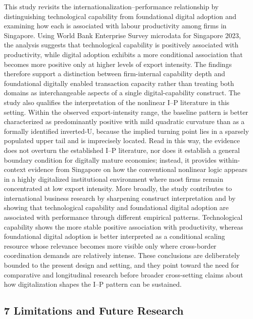 \documentclass[
  12pt,a4paper]{article}
\begin{document}
This study revisits the internationalization--performance relationship
by distinguishing technological capability from foundational digital
adoption and examining how each is associated with labour productivity
among firms in Singapore. Using World Bank Enterprise Survey microdata
for Singapore 2023, the analysis suggests that technological capability
is positively associated with productivity, while digital adoption
exhibits a more conditional association that becomes more positive only
at higher levels of export intensity. The findings therefore support a
distinction between firm-internal capability depth and foundational
digitally enabled transaction capacity rather than treating both domains
as interchangeable aspects of a single digital-capability construct. The
study also qualifies the interpretation of the nonlinear I--P literature
in this setting. Within the observed export-intensity range, the
baseline pattern is better characterized as predominantly positive with
mild quadratic curvature than as a formally identified inverted-U,
because the implied turning point lies in a sparsely populated upper
tail and is imprecisely located. Read in this way, the evidence does not
overturn the established I--P literature, nor does it establish a
general boundary condition for digitally mature economies; instead, it
provides within-context evidence from Singapore on how the conventional
nonlinear logic appears in a highly digitalized institutional
environment where most firms remain concentrated at low export
intensity. More broadly, the study contributes to international business
research by sharpening construct interpretation and by showing that
technological capability and foundational digital adoption are
associated with performance through different empirical patterns.
Technological capability shows the more stable positive association with
productivity, whereas foundational digital adoption is better
interpreted as a conditional scaling resource whose relevance becomes
more visible only where cross-border coordination demands are relatively
intense. These conclusions are deliberately bounded to the present
design and setting, and they point toward the need for comparative and
longitudinal research before broader cross-setting claims about how
digitalization shapes the I--P pattern can be sustained.

\hypertarget{limitations-and-future-research}{%
\subsection{7 Limitations and Future
Research}\label{limitations-and-future-research}}
\end{document}
